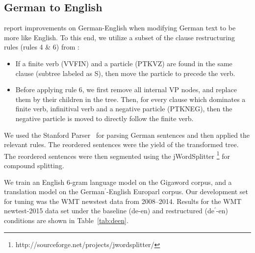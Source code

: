 
\subsection{German to English}

%
 report improvements on German-English when modifying German text to be more like English.
%
%
%
%
To this end, we utilize a subset of the clause restructuring rules (rules 4 \& 6) from :


\begin{itemize}
%
\item If a finite verb ({VVFIN}) and a particle ({PTKVZ}) are found in the same clause (subtree labeled as S), then move the particle to precede the verb.
%
\item Before applying rule 6, we first remove all internal {VP} nodes, and replace them by their children in the tree. 
      Then, for every clause which dominates a finite verb, infinitival verb and a negative particle ({PTKNEG}), then the negative particle is moved to directly follow the finite verb.
%
\end{itemize}


We used the Stanford Parser~\cite{manning-EtAl:2014:P14-5} for parsing German sentences and then applied the relevant rules. The reordered sentences were the yield of the transformed tree. The reordered sentences were then segmented using the jWordSplitter \footnote{http://sourceforge.net/projects/jwordsplitter/} for compound splitting.

We train an English 6-gram language model on the Gigaword corpus, and a translation model on the German$^\prime$-English Europarl corpus.
%
Our development set for tuning was the WMT newstest data from 2008--2014.
%
Results for the WMT newtest-2015 data set under the baseline (de-en) and restructured (de$^\prime$-en) conditions are shown in Table~\ref{tab:deen}.


